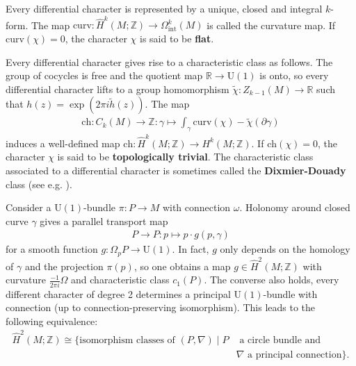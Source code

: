     \begin{property}[Curvature]
        Every differential character is represented by a unique, closed and integral $k$-form. The map $\mathrm{curv}:\hat{H}^k(M;\mathbb{Z})\rightarrow\Omega^k_\mathrm{int}(M)$ is called the curvature map. If $\mathrm{curv}(\chi)=0$, the character $\chi$ is said to be \textbf{flat}.
    \end{property}

    \begin{property}
        Every differential character gives rise to a characteristic class as follows. The group of cocycles is free and the quotient map $\mathbb{R}\rightarrow\mathrm{U}(1)$ is onto, so every differential character lifts to a group homomorphism $\widetilde{\chi}:Z_{k-1}(M)\rightarrow\mathbb{R}$ such that $h(z)=\exp(2\pi i\widetilde{h}(z))$. The map
        \begin{gather}
            \mathrm{ch}:C_k(M)\rightarrow\mathbb{Z}:\gamma\mapsto\int_\gamma\mathrm{curv}(\chi)-\widetilde{\chi}(\partial\gamma)
        \end{gather}
        induces a well-defined map $\mathrm{ch}:\hat{H}^k(M;\mathbb{Z})\rightarrow H^k(M;\mathbb{Z})$. If $\mathrm{ch}(\chi)=0$, the character $\chi$ is said to be \textbf{topologically trivial}. The characteristic class associated to a differential character is sometimes called the \textbf{Dixmier-Douady} class (see e.g. \cite{brylinski}).
    \end{property}

    \begin{example}
        Consider a $\mathrm{U}(1)$-bundle $\pi:P\rightarrow M$ with connection $\omega$. Holonomy around closed curve $\gamma$ gives a parallel transport map
        \begin{gather}
            P\rightarrow P:p\mapsto p\cdot g(p,\gamma)
        \end{gather}
        for a smooth function $g:\Omega_p P\rightarrow\mathrm{U}(1)$. In fact, $g$ only depends on the homology of $\gamma$ and the projection $\pi(p)$, so one obtains a map $g\in\hat{H}^2(M;\mathbb{Z})$ with curvature $\frac{-1}{2\pi i}\Omega$ and characteristic class $c_1(P)$. The converse also holds, every different character of degree 2 determines a principal $\mathrm{U}(1)$-bundle with connection (up to connection-preserving isomorphism). This leads to the following equivalence:
        \begin{align}
            \hat{H}^2(M;\mathbb{Z})\cong\{\text{isomorphism classes of }(P,\nabla)\mid P&\text{ a circle bundle and }\\
            &\nabla\text{ a principal connection}\}.\nonumber
        \end{align}
    \end{example}


